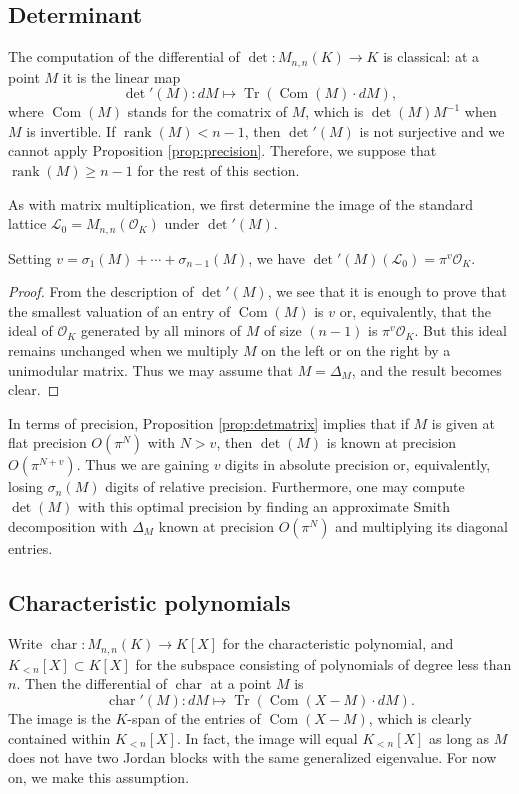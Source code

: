 \documentclass{sig-alternate-2013}
\DeclareMathOperator{\tr}{Tr}
\DeclareMathOperator{\com}{Com}
\DeclareMathOperator{\rank}{rank}
\renewcommand{\O}{\mathcal O}
\newcommand{\detp}{\det{'}}
\DeclareMathOperator{\charpoly}{char}
\newcommand{\charp}{\charpoly'}
\begin{document}
\subsection{Determinant}
\label{ssec:det}

The computation of the differential of $\det : M_{n,n}(K) \to K$
is classical: at a point $M$ it is the linear map
\[
\detp(M) : dM \mapsto \tr(\com(M) \cdot dM),
\]
where $\com(M)$ stands for the comatrix of $M$, which is $\det(M) M^{-1}$ when $M$ is invertible. If $\rank(M) < n - 1$,
then $\detp(M)$ is not surjective and we cannot apply Proposition 
\ref{prop:precision}. Therefore, we suppose that $\rank(M) \ge n-1$ for the rest of this section.

As with matrix multiplication, we first determine the image of
the standard lattice $\mathcal L_0 = M_{n,n}(\O_K)$ under $\detp(M)$.

\begin{prop}
\label{prop:detmatrix}
Setting $v = \sigma_1(M) + \cdots + \sigma_{n-1}(M)$, we have
$\detp(M)(\mathcal L_0) = \pi^v \O_K$.
\end{prop}

\begin{proof}
From the description of $\detp(M)$, we see that it is enough to prove 
that the smallest valuation of an entry of $\com(M)$ is $v$
or, equivalently, that the ideal of $\O_K$ generated by all 
minors of $M$ of size $(n-1)$ is $\pi^v
\O_K$. But this ideal remains unchanged when we multiply $M$ 
on the left or on the right by a unimodular matrix. Thus we may 
assume that $M = \Delta_M$, and the result becomes clear.
\end{proof}

In terms of precision, Proposition \ref{prop:detmatrix} implies that if 
$M$ is given at flat precision $O(\pi^N)$ with $N > v$, then $\det(M)$ 
is known at precision $O(\pi^{N+v})$.  Thus we are gaining $v$  
digits in absolute precision or, equivalently, losing $\sigma_n(M)$ digits
of relative precision.
Furthermore, one may compute $\det(M)$ with this optimal precision by finding an approximate
Smith decomposition with $\Delta_M$ known at precision $O(\pi^N)$ and
multiplying its diagonal entries. 

\subsection{Characteristic polynomials} \label{ssec:charpoly}

Write $\charpoly : M_{n,n}(K) \to K[X]$ for the characteristic 
polynomial, and $K_{<n}[X] \subset K[X]$ for the subspace consisting of 
polynomials of degree less than $n$.  Then the differential of 
$\charpoly$ at a point $M$ is
\[
\charp(M) : dM \mapsto \tr(\com(X - M) \cdot dM).
\]
The image is the $K$-span of the entries of $\com(X{-}M)$, which is 
clearly contained within $K_{<n}[X]$.  In fact, the image will equal 
$K_{<n}[X]$ as long as $M$ does not have two Jordan blocks with the same 
generalized eigenvalue. For now on, we make this assumption.
\end{document}
